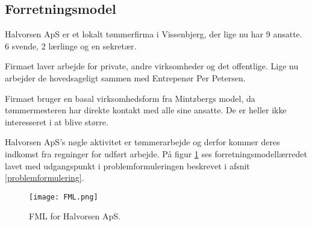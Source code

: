 \subsection{Forretningsmodel}

Halvorsen ApS er et lokalt tømmerfirma i Vissenbjerg, der lige nu har 9 ansatte. 6 svende, 2 lærlinge og en sekretær.

Firmaet laver arbejde for private, andre virksomheder og det offentlige.
Lige nu arbejder de hovedsageligt sammen med Entrepenør Per Petersen.

Firmaet bruger en basal virksomhedsform fra Mintzbergs model, da tømmermesteren har direkte kontakt med alle sine ansatte. De er heller ikke interesseret i at blive større.

Halvorsen ApS's nøgle aktivitet er tømmerarbejde og derfor kommer deres indkomst fra regninger for udført arbejde. På figur \ref{fml} ses forretningsmodellærredet lavet med udgangspunkt i problemformuleringen beskrevet i afsnit \ref{problemformulering}.

\begin{figure} \label{fml}
    \caption{FML for Halvorsen ApS.}
    \centering
        \texttt{[image: FML.png]}
\end{figure}
